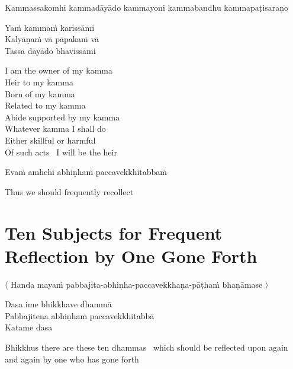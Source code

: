 \begin{pali-hangtogether}
Kammassakomhi kammadāyādo kammayoni kammabandhu kammapaṭisaraṇo\\
\end{pali-hangtogether}
Yaṁ kammaṁ karissāmi\\
Kalyāṇaṁ vā pāpakaṁ vā\\
Tassa dāyādo bhavissāmi

\begin{english}
  I am the owner of my kamma\\
  Heir to my kamma\\
  Born of my kamma\\
  Related to my kamma\\
  Abide supported by my kamma\\
  Whatever kamma I shall do\\
  Either skillful or harmful\\
  Of such acts \breathmark\ I will be the heir\hyperlink{endnote97-appendix}{\hypertarget{endnote97-body}{}}
\end{english}

Evaṁ amhehi abhiṇhaṁ paccavekkhitabbaṁ

\begin{english}
  Thus we should frequently recollect
\end{english}

\suttaRef{[AN 5.57]}


\section{Ten Subjects for Frequent Reflection by One Gone Forth}
\label{ten-recollections}

\begin{leader}
  〈 Handa mayaṁ pabbajita-abhiṇha-paccavekkhaṇa-pāṭhaṁ bhaṇāmase 〉
\end{leader}

Dasa ime bhikkhave dhammā\\
Pabbajitena abhiṇhaṁ paccavekkhitabbā\\
Katame dasa

\begin{english-hang}
  Bhikkhus there are these ten dhammas\hyperlink{endnote98-appendix}{\hypertarget{endnote98-body}{}}
  \breathmark\ which should be reflected upon again and again by one who has gone forth\\
\end{english-hang}

